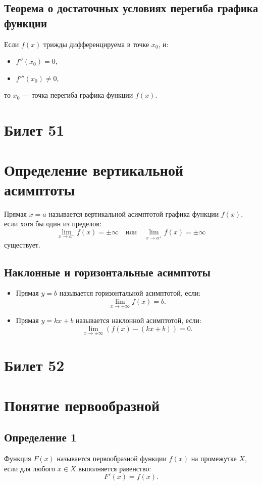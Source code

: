 \documentclass{article}
\begin{document}
\subsection*{Теорема о достаточных условиях перегиба графика функции}
Если \( f(x) \) трижды дифференцируема в точке \( x_0 \), и:
\begin{itemize}
    \item \( f''(x_0) = 0 \),
    \item \( f'''(x_0) \neq 0 \),
\end{itemize}
то \( x_0 \) — точка перегиба графика функции \( f(x) \).


\section{Билет 51}

\section*{Определение вертикальной асимптоты}
Прямая \( x = a \) называется вертикальной асимптотой графика функции \( f(x) \), если хотя бы один из пределов:
\[
\lim_{x \to a^-} f(x) = \pm \infty \quad \text{или} \quad \lim_{x \to a^+} f(x) = \pm \infty
\]
существует.

\subsection*{Наклонные и горизонтальные асимптоты}
\begin{itemize}
    \item Прямая \( y = b \) называется горизонтальной асимптотой, если:
    \[
    \lim_{x \to \pm \infty} f(x) = b.
    \]
    \item Прямая \( y = kx + b \) называется наклонной асимптотой, если:
    \[
    \lim_{x \to \pm \infty} \left( f(x) - (kx + b) \right) = 0.
    \]
\end{itemize}


\section{Билет 52}

\section*{Понятие первообразной}

\subsection*{Определение 1}
Функция \( F(x) \) называется первообразной функции \( f(x) \) на промежутке \( X \), если для любого \( x \in X \) выполняется равенство:
\[
F'(x) = f(x).
\]
\end{document}
